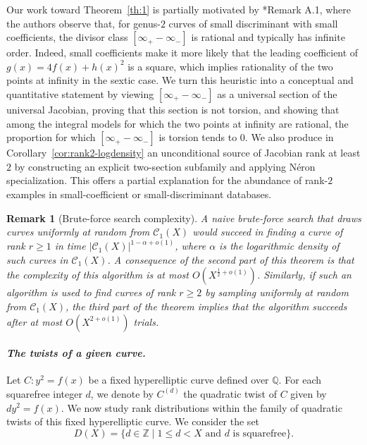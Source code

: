 \documentclass{amsart}
\newcommand{\Q}{{\mathbb Q}}
\newcommand{\cC}{\mathcal{C}}
\newtheorem{remark}[proposition]{Remark}
\begin{document}
Our work toward Theorem~\ref{th:1} is partially motivated by
\cite{Booker2016}*{Remark A.1}, where the authors observe that, for genus-\(2\)
curves of small discriminant with small coefficients, the divisor class
\([\infty_+-\infty_-]\) is rational and typically has infinite order. Indeed,
small coefficients make it more likely that the leading coefficient of
\(g(x)=4f(x)+h(x)^2\) is a square, which implies rationality of the two points at
infinity in the sextic case. We turn this heuristic into a conceptual and
quantitative statement by viewing \([\infty_+-\infty_-]\) as a universal section
of the universal Jacobian, proving that this section is not torsion, and showing
that among the integral models for which the two points at infinity are rational,
the proportion for which \([\infty_+-\infty_-]\) is torsion tends to \(0\). We
also produce in Corollary~\ref{cor:rank2-logdensity} an unconditional source of
Jacobian rank at least \(2\) by constructing an explicit two-section subfamily
and applying N\'eron specialization. This offers a partial explanation for the
abundance of rank-\(2\) examples in small-coefficient or small-discriminant
databases.

\begin{remark}[Brute-force search complexity] \label{rmk:brute-force} A naive brute-force search that draws curves uniformly at random from $\cC_{1}(X)$ would succeed in finding a curve of rank $r \geq 1$ in time $|\cC_1(X)|^{1-\alpha + o(1)}$, where $\alpha$ is the logarithmic density of such curves in $\cC_1(X)$. A consequence of the second part of this theorem is that the complexity of this algorithm is at most $O(X^{\frac{1}{2}+o(1)})$. Similarly, if such an algorithm is used to find curves of rank $r \geq 2$ by sampling uniformly at random from $\cC_1(X)$, the third part of the theorem implies that the algorithm succeeds after at most $O(X^{2+o(1)})$ trials.
\end{remark}


\medskip



\paragraph{\emph{The twists of a given curve.}} Let $C : y^2 = f(x)$ be a fixed hyperelliptic curve defined over $\Q$. For each
squarefree integer $d$, we denote by $C^{(d)}$ the quadratic twist of $C$ given by $dy^2=f(x)$. We now study rank distributions within the family of quadratic twists of this
fixed hyperelliptic curve. We
consider the set
\begin{equation}\label{eq:twist-DX}
D(X)=\{d \in \mathbb Z \mid 1\leq d<X\text{ and } d \text{ is squarefree}\}.
\end{equation}
\end{document}
